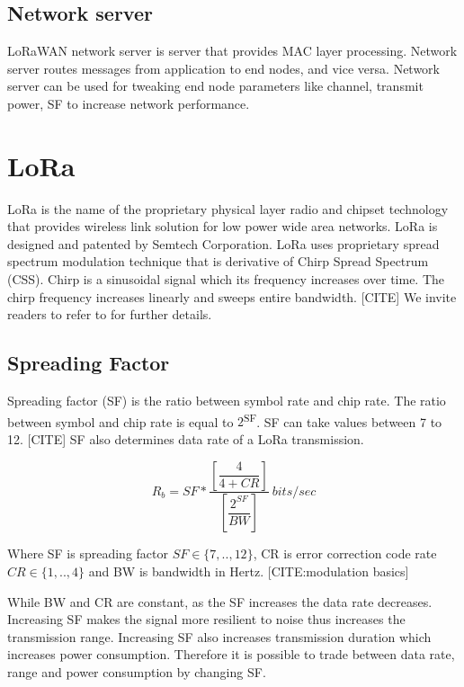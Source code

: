 \documentclass[conference]{IEEEtran}
\begin{document}
\subsection{Network server}
\par LoRaWAN network server is server that provides MAC layer processing. Network server routes messages from application to end nodes, and vice versa. Network server can be used for tweaking end node parameters like channel, transmit power, SF to increase network performance.  


\section{LoRa}
\par LoRa is the name of the proprietary physical layer radio and chipset technology that provides wireless link solution for low power wide area networks. LoRa is designed and patented by Semtech Corporation. LoRa uses proprietary spread spectrum modulation technique that is derivative of Chirp Spread Spectrum (CSS). Chirp is a sinusoidal signal which its  frequency increases over time. The chirp frequency increases linearly and sweeps entire bandwidth. [CITE] We invite readers to refer to \cite{AN1200.22} for further details.

\subsection{Spreading Factor}
\par Spreading factor (SF) is the ratio between symbol rate and chip rate. The ratio between symbol and chip rate is equal to $2$\textsuperscript{SF}. SF can take values between 7 to 12. [CITE] SF also determines data rate of a LoRa transmission.

\begin{equation} \label{eq:bit_rate_sf}
R_{b} = SF * \dfrac{\left[ \dfrac{4}{4+CR} \right] }{ \left[ \dfrac{2^{SF}}{BW} \right]} \ bits/sec
\end{equation}

Where SF is spreading factor $SF \in \{7,..,12\}$, CR is error correction code rate $CR \in \{1,..,4\}$ and BW is bandwidth in Hertz. [CITE:modulation basics]

\par While BW and CR are constant, as the SF increases the data rate decreases. Increasing SF makes the signal more resilient to noise thus increases the transmission range. Increasing SF also increases transmission duration which increases power consumption. Therefore it is possible to trade between data rate, range and power consumption by  changing SF.
\end{document}
